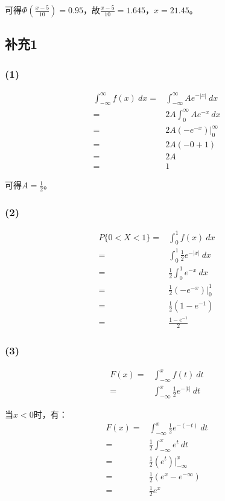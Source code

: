 \documentclass[a4paper,12pt]{ctexart}
\begin{document}
可得$\Phi\left(\frac{x - 5}{10}\right) = 0.95$，故$\frac{x - 5}{10} = 1.645$，$x = 21.45$。

\subsection*{补充1}

\subsubsection*{(1)}

\begin{align*}
	\int_{-\infty}^{\infty} f(x)\ dx =& \int_{-\infty}^{\infty} Ae^{-|x|}\ dx\\
	=& 2A \int_{0}^{\infty} Ae^{-x}\ dx\\
	=& 2A \left(-e^{-x}\right) \Big|_0^\infty\\
	=& 2A (-0 + 1)\\
	=& 2A\\
	=& 1
\end{align*}

可得$A = \frac{1}{2}$。

\subsubsection*{(2)}

\begin{align*}
	P\{0 < X < 1\} =& \int_{0}^{1} f(x)\ dx\\
	=& \int_{0}^{1} \frac{1}{2} e^{-|x|}\ dx\\
	=& \frac{1}{2} \int_{0}^{1} e^{-x}\ dx\\
	=& \frac{1}{2} \left(-e^{-x}\right) \Big|_0^1\\
	=& \frac{1}{2} (1 - e^{-1})\\
	=& \frac{1 - e^{-1}}{2}
\end{align*}

\subsubsection*{(3)}

\begin{align*}
	F(x) =& \int_{-\infty}^{x} f(t)\ dt\\
	=& \int_{-\infty}^{x} \frac{1}{2} e^{-|t|}\ dt
\end{align*}

当$x < 0$时，有：
\begin{align*}
	F(x) =& \int_{-\infty}^{x} \frac{1}{2} e^{-(-t)}\ dt\\
	=& \frac{1}{2} \int_{-\infty}^{x} e^{t}\ dt\\
	=& \frac{1}{2} \left(e^{t}\right) \Big|_{-\infty}^{x}\\
	=& \frac{1}{2} (e^{x} - e^{-\infty})\\
	=& \frac{1}{2} e^{x}
\end{align*}
\end{document}
